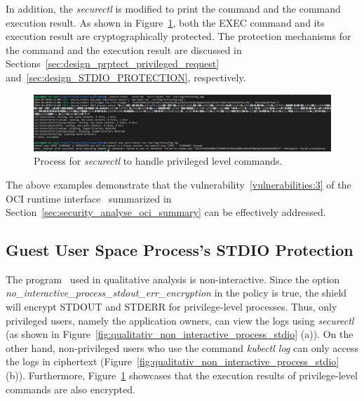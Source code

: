 In addition, the \emph{securectl} is modified to print the command and the command execution result. As shown in Figure~\ref{fig:cquark_priviled_cmd_result_protection}, both the EXEC command and its execution result are cryptographically protected. The protection mechanisms for the command 
and the execution result are discussed in Sections~\ref{sec:design_prptect_privileged_request} and~\ref{sec:design_STDIO_PROTECTION}, respectively.
\begin{figure}[!htb]
  \centering
  \includegraphics[width=1\textwidth]{images/cquark_priviled_cmd_result_protection.PNG}
  \caption[Process for \emph{securectl} to handle privileged level commands]{Process for \emph{securectl} to handle privileged level commands.}
  \label{fig:cquark_priviled_cmd_result_protection}
\end{figure}

The above examples demonstrate that the vulnerability~\ref{vulnerabilities:3} of the OCI runtime interface~\cite*{oci-runtime-spec} summarized in Section~\ref{sec:security_analyse_oci_summary} can be effectively addressed.



\subsection{Guest User Space Process's STDIO Protection}
\label{sec:eva_qualitativ_secure_stdio}
The program~\cite*{qualitativ_programs} used in qualitative analysis is non-interactive. Since the option \emph{no\_interactive\_process\_stdout\_err\_encryption} in the policy is true, the shield will encrypt STDOUT and STDERR for privilege-level processes. Thus, only privileged users, 
namely the application owners, can view the logs using \emph{securectl} (as shown in Figure~\ref{fig:qualitativ_non_interactive_process_stdio} (a)). On the other hand, non-privileged users who use the command \emph{kubectl log} can only access the logs in ciphertext (Figure~\ref{fig:qualitativ_non_interactive_process_stdio} (b)).
Furthermore, Figure~\ref{fig:cquark_priviled_cmd_result_protection} showcases that the execution results of privilege-level commands are also encrypted.

